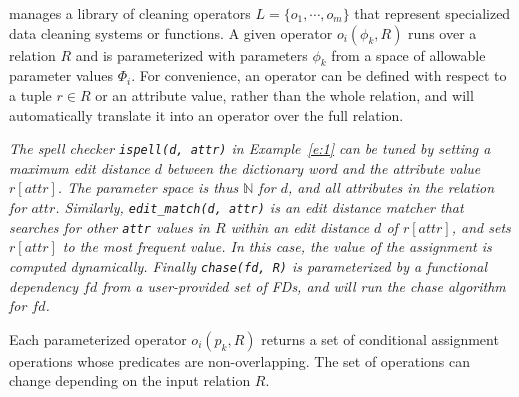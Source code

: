 
\sys manages a library of cleaning operators $L = \{o_1, \cdots, o_m\}$ that represent specialized data cleaning systems or functions.  A given operator $o_i(\phi_k, R)$ runs over a relation $R$ and is parameterized with parameters $\phi_k$ from a space of allowable parameter values $\Phi_i$.  For convenience, an operator can be defined with respect to a tuple $r\in R$  or an attribute value, rather than the whole relation, and \sys will automatically translate it into an operator over the full relation.

\begin{example}\it\label{e:2}
  The spell checker  \texttt{ispell(d, attr)} in Example~\ref{e:1} can be tuned by setting a maximum edit distance $d$ between the dictionary word and the attribute value $r[attr]$.  The parameter space is thus $\mathbb{N}$ for $d$, and all attributes in the relation for $attr$. Similarly, \texttt{edit\_match(d, attr)} is an edit distance matcher that searches for other \texttt{attr} values in $R$ within an edit distance $d$ of $r[attr]$, and sets $r[attr]$ to the most frequent value.  In this case, the value of the assignment is computed dynamically.  Finally \texttt{chase(fd, R)} is parameterized by a functional dependency $fd$ from a user-provided set of FDs, and will run the chase algorithm~\cite{Deutsch2008TheCR} for $fd$. 
\end{example}

Each parameterized operator $o_i(p_k, R)$ returns a set of conditional assignment operations whose predicates are non-overlapping.  The set of operations can change depending on the input relation $R$.   %



